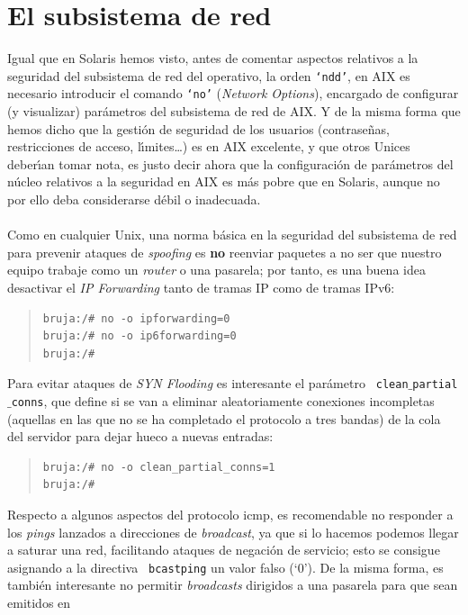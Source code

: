 \section{El subsistema de red}
Igual que en Solaris hemos visto, antes de comentar aspectos relativos a la
seguridad del subsistema de red del operativo, la orden {\tt `ndd'}, en AIX es
necesario introducir el comando {\tt `no'} ({\it Network Options}), encargado 
de configurar (y visualizar) par\'ametros del subsistema de red de AIX. Y de la 
misma forma que hemos dicho que la gesti\'on de seguridad de los usuarios 
(contrase\~nas, 
restricciones de acceso, l\'{\i}mites\ldots) es en AIX excelente, y que otros
Unices deber\'{\i}an tomar nota, es justo decir ahora que la configuraci\'on de 
par\'ametros del n\'ucleo relativos a la seguridad en AIX es m\'as pobre que en 
Solaris, aunque no por ello deba considerarse d\'ebil o inadecuada.\\
\\Como en cualquier Unix, una norma b\'asica en la seguridad del subsistema de
red para prevenir ataques de {\it spoofing} es {\bf no} reenviar paquetes a no 
ser que nuestro equipo trabaje como un {\it router} o una pasarela; por tanto, 
es una buena idea desactivar el {\it IP Forwarding} tanto de tramas IP como de
tramas IPv6: 
\begin{quote}
\begin{verbatim}
bruja:/# no -o ipforwarding=0
bruja:/# no -o ip6forwarding=0
bruja:/#
\end{verbatim}
\end{quote}
Para evitar ataques de {\it SYN Flooding} es interesante el par\'ametro {\tt
clean$\_$partial$\_$conns}, que define si se van a eliminar aleatoriamente 
conexiones incompletas (aquellas en las que no se ha completado el protocolo a 
tres bandas) de la cola del servidor para dejar hueco a nuevas entradas:
\begin{quote}
\begin{verbatim}
bruja:/# no -o clean_partial_conns=1
bruja:/#
\end{verbatim}
\end{quote}
Respecto a algunos aspectos del protocolo {\sc icmp}, es recomendable no 
responder a los {\it pings} lanzados a direcciones de {\it broadcast}, ya que 
si lo hacemos podemos llegar a saturar una red, facilitando ataques de 
negaci\'on de servicio; esto se consigue asignando a la directiva {\tt 
bcastping} un valor falso (`0'). De la misma forma, es tambi\'en interesante 
no permitir {\it broadcasts} dirigidos a una pasarela para que sean emitidos en
